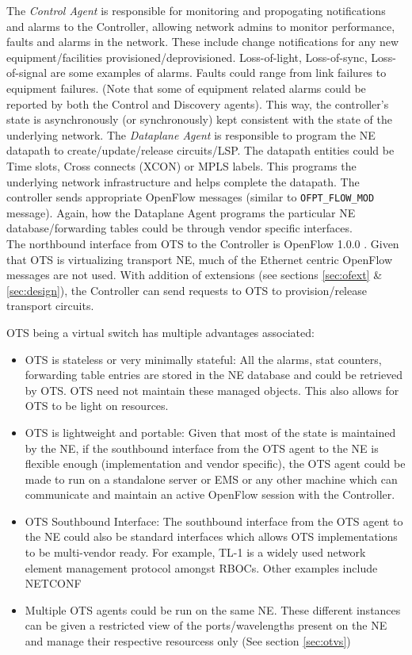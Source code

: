 \documentclass{sig-alternate-10pt}
\begin{document}
	The \textit{Control Agent} is responsible for monitoring and propogating notifications and alarms to the
	Controller, allowing network admins to monitor 
	performance, faults and alarms in the network. These include change notifications for any new equipment/facilities 
	provisioned/deprovisioned. Loss-of-light, Loss-of-sync, Loss-of-signal are some 
	examples of alarms. Faults could range from link failures to equipment failures. (Note that some of
	equipment related alarms could be reported by both the Control and Discovery agents). This way, the
	controller's state is asynchronously (or synchronously) kept consistent with the state of the underlying
	network. The \textit{Dataplane Agent} is responsible to program the NE datapath to create/update/release
	circuits/LSP. The datapath entities could be Time slots, Cross connects (XCON) or MPLS labels. This
	programs the underlying network infrastructure and helps complete the datapath. The controller sends
	appropriate OpenFlow messages (similar to \texttt{OFPT\_FLOW\_MOD} message). Again, how the Dataplane
	Agent programs the particular NE database/forwarding tables could be through vendor specific interfaces. \\
	
	The northbound interface from OTS to the Controller is OpenFlow 1.0.0 \cite{OF1.0}. Given that OTS is
	virtualizing transport NE, much of the Ethernet centric OpenFlow messages are not used. With addition of
	extensions (see sections \ref{sec:ofext} \& \ref{sec:design}), the Controller can send requests to OTS
	to provision/release transport circuits.
	
	OTS being a virtual switch has multiple advantages associated:

	\begin{itemize}
	    \item OTS is stateless or very minimally stateful: All the alarms, stat counters, forwarding table entries are 
		stored in the NE database and could be retrieved by OTS. OTS need not maintain these managed objects. 
		This also allows for OTS to be light on resources.
	    \item OTS is lightweight and portable: Given that most of the state is maintained by the NE, if the southbound 
		interface from the OTS agent to the NE is flexible enough (implementation and vendor specific), the OTS 
		agent could be made to run on a standalone server or EMS or any other machine which can communicate 
		and maintain an active OpenFlow session with the Controller.
	    \item OTS Southbound Interface: The southbound interface from the OTS agent to the NE could also be 
		standard interfaces which allows OTS implementations to be multi-vendor ready. For example, TL-1 \cite{tl1} 
		is a widely used network element management protocol amongst RBOCs. Other 	examples include NETCONF \cite{netconf}
  	    \item Multiple OTS agents could be run on the same NE. These different instances can be given a restricted 
		view of the ports/wavelengths present on the NE and manage their respective resourcess only 
		(See section \ref{sec:otvs})
	\end{itemize}
\end{document}
